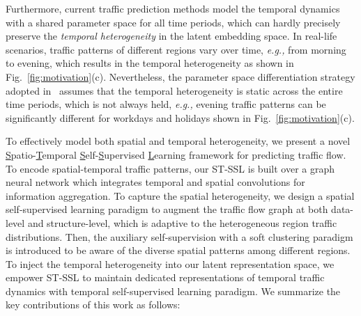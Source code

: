 \documentclass[letterpaper]{article} \usepackage{aaai23}  \usepackage{times}  \usepackage{helvet}  \usepackage{courier}  \usepackage[hyphens]{url}  \usepackage{graphicx} \urlstyle{rm} \def\UrlFont{\rm}  \usepackage{natbib}  \usepackage{caption} \frenchspacing  \setlength{\pdfpagewidth}{8.5in} \setlength{\pdfpageheight}{11in}
\newcommand{\eg}{\emph{e.g.,}\xspace}
\newcommand{\name}{ST-SSL\xspace}
\newcommand{\figureautorefname}{Fig.}
\begin{document}
Furthermore, current traffic prediction methods model the temporal dynamics with a shared parameter space for all time periods, which can hardly precisely preserve the \emph{temporal heterogeneity} in the latent embedding space. In real-life scenarios, traffic patterns of different regions vary over time, \eg from morning to evening, which results in the temporal heterogeneity as shown in \figureautorefname{~\ref{fig:motivation}}(c). Nevertheless, the parameter space differentiation strategy adopted in~\cite{song2020spatial, li2021spatial} assumes that the temporal heterogeneity is static across the entire time periods, which is not always held, \eg evening traffic patterns can be significantly different for workdays and holidays shown in \figureautorefname{~\ref{fig:motivation}}(c). 






To effectively model both spatial and temporal heterogeneity, we present a novel \underline{S}patio-\underline{T}emporal \underline{S}elf-\underline{S}upervised \underline{L}earning framework for predicting traffic flow. To encode spatial-temporal traffic patterns, our \name is built over a graph neural network which integrates temporal and spatial convolutions for information aggregation. To capture the spatial heterogeneity, we design a spatial self-supervised learning paradigm to augment the traffic flow graph at both data-level and structure-level, which is adaptive to the heterogeneous region traffic distributions. Then, the auxiliary self-supervision with a soft clustering paradigm is introduced to be aware of the diverse spatial patterns among different regions. To inject the temporal heterogeneity into our latent representation space, we empower \name to maintain dedicated representations of temporal traffic dynamics with temporal self-supervised learning paradigm. We summarize the key contributions of this work as follows:
\end{document}
